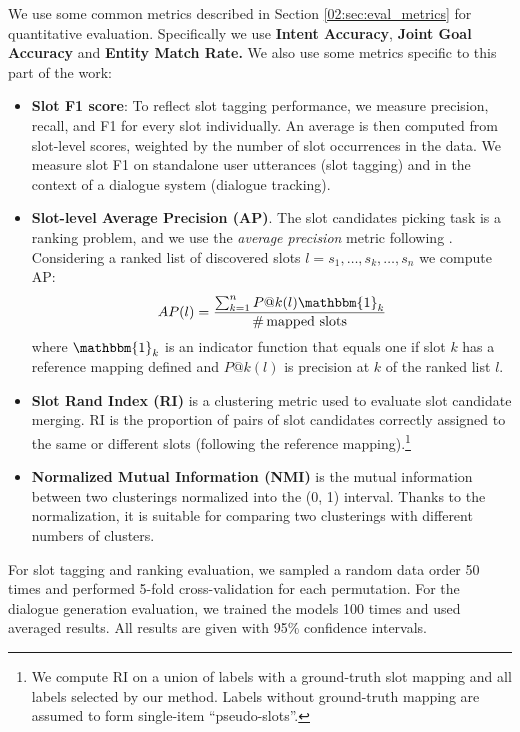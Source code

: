 We use some common metrics described in Section \ref{02:sec:eval_metrics} for quantitative evaluation.
Specifically we use \textbf{Intent Accuracy}, \textbf{Joint Goal Accuracy} and \textbf{Entity Match Rate.}
We also use some metrics specific to this part of the work:
\begin{itemize}
    \item \textbf{Slot F1 score}: To reflect slot tagging performance, we measure precision, recall, and F1 for every slot individually.
    An average is then computed from slot-level scores, weighted by the number of slot occurrences in the data.
    We measure slot F1 on standalone user utterances (slot tagging) and in the context of a dialogue system (dialogue tracking).
    \item \textbf{Slot-level Average Precision (AP)}. The slot candidates picking task is a ranking problem, and we use the \textit{average precision} metric following \citet{chen2014leveraging}.
    Considering a ranked list of discovered slots $l = s_1, \dots, s_k, \dots, s_n$ we compute AP:
    \begin{equation}
        AP(l) = \frac{\sum_{k=1}^n P@k(l)\mathbbm{1}_k}{\mbox{\#\,mapped\ slots}}
    \end{equation}
    where $\mathbbm{1}_k$ is an indicator function that equals one if slot $k$ has a reference mapping defined and $P@k(l)$ is precision at $k$ of the ranked list $l$.
    \item \textbf{Slot Rand Index (RI)} is a clustering metric used to evaluate slot candidate merging. RI is the proportion of pairs of slot candidates correctly assigned to the same or different slots (following the reference mapping).\footnote{We compute RI on a union of labels with a ground-truth slot mapping and all labels selected by our method. Labels without ground-truth mapping are assumed to form single-item “pseudo-slots”.}
    
    \item \textbf{Normalized Mutual Information (NMI)} is the mutual information between two clusterings normalized into the (0, 1) interval.
    Thanks to the normalization, it is suitable for comparing two clusterings with different numbers of clusters.
\end{itemize}

For slot tagging and ranking evaluation, we sampled a random data order 50 times and performed 5-fold cross-validation for each permutation.
For the dialogue generation evaluation, we trained the models 100 times and used averaged results.
All results are given with 95\% confidence intervals.

